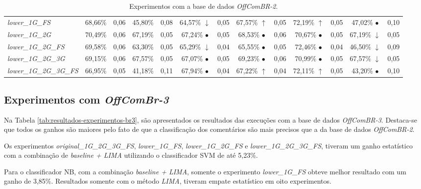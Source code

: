 \begin{table}[h]
{\begin{tabular}{l|cccc|cccc|cccc}
\textit{lower\_1G\_FS} & 68,66\% & 0,06 & 45,80\% & 0,08 & 64,57\% $\downarrow$ & 0,05 & 67,57\% $\uparrow$ & 0,05 & 72,19\% $\uparrow$ & 0,05 & 47,02\% $\bullet$ & 0,10 \\
\textit{lower\_1G\_2G} & 70,49\% & 0,06 & 67,19\% & 0,05 & 67,24\% $\bullet$ & 0,05 & 68,53\% $\bullet$ & 0,06 & 70,67\% $\bullet$ & 0,05 & 67,19\% $\downarrow$ & 0,05 \\
\textit{lower\_1G\_2G\_FS} & 69,58\% & 0,06 & 63,30\% & 0,05 & 65,29\% $\downarrow$ & 0,04 & 65,55\% $\bullet$ & 0,05 & 72,46\% $\bullet$ & 0,04 & 46,50\% $\downarrow$ & 0,09 \\
\textit{lower\_1G\_2G\_3G} & 69,15\% & 0,06 & 67,57\% & 0,05 & 67,07\% $\bullet$ & 0,05 & 69,23\% $\bullet$ & 0,06 & 70,99\% $\bullet$ & 0,05 & 67,57\% $\downarrow$ & 0,05 \\
\textit{lower\_1G\_2G\_3G\_FS} & 66,95\% & 0,05 & 41,18\% & 0,11 & 67,94\% $\bullet$ & 0,04 & 67,22\% $\uparrow$ & 0,04 & 72,11\% $\uparrow$ & 0,05 & 43,20\% $\bullet$ & 0,10 \\ \hline
\end{tabular}
}
\caption{Experimentos com a base de dados {\it OffComBR-2}.}\label{tab:resultados-experimentos-br2}
\end{table}

\subsection{Experimentos com {\it OffComBr-3}}

Na Tabela \ref{tab:resultados-experimentos-br3}, são apresentados os resultados das execuções com a base de dados {\it OffComBR-3}. Destaca-se que todos os ganhos são maiores pelo fato de que a classificação dos comentários são mais precisos que a da base de dados {\it OffComBR-2}. 

Os experimentos {\it original\_1G\_2G\_3G\_FS}, {\it lower\_1G\_FS}, {\it lower\_1G\_2G\_FS} e {\it lower\_1G\_2G\_3G\_FS}, tiveram um ganho estatístico com a combinação de {\it baseline + LIMA} utilizando o classificador SVM de até 5,23\%. 

Para o classificador NB, com a combinação {\it baseline + LIMA}, somente o experimento {\it lower\_1G\_FS} obteve melhor resultado com um ganho de 3,85\%. Resultados somente com o método {\it LIMA}, tiveram empate estatístico em oito experimentos.

